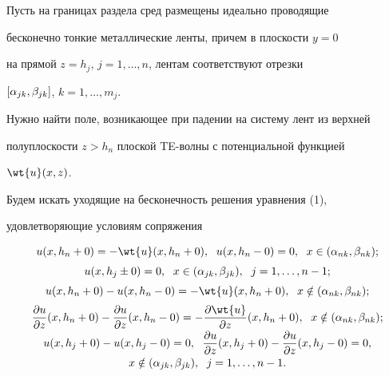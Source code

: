 Пусть на границах раздела сред размещены идеально проводящие


бесконечно тонкие металлические ленты, причем в плоскости $y=0$


на прямой $z=h_j$, $j=1,\dotsc,n$, лентам соответствуют отрезки


$[\alpha_{jk}, \beta_{jk}]$, $k=1,\dotsc,m_j$.


Нужно найти поле, возникающее при падении на систему лент из верхней


полуплоскости $z>h_n$ плоской TE-волны с потенциальной функцией


$\wt{u}(x,z)$.





Будем искать уходящие на бесконечность решения уравнения (1),


удовлетворяющие условиям сопряжения


\begin{equation}


\begin{array}{c}


u(x,h_n+0)=-\wt{u}(x,h_n+0),\ \; u(x,h_n-0)=0, 


\ \; x\in (\al_{nk},\be_{nk});\\[2mm]


%


u(x,h_j\pm0)=0,\ \;  x\in (\al_{jk},\be_{jk}), \ \;


j=1,\dotsc,n-1;\\[2mm]


%


u(x,h_n+0)-u(x,h_n-0)=-\wt{u}(x,h_n+0), 


\ \; x\notin (\al_{nk},\be_{nk});\\[2mm]


%


\dfrac{\pa u}{\pa z}(x,h_n+0)-\dfrac{\pa u}{\pa z}(x,h_n-0)


=-\dfrac{\pa\wt{u}}{\pa z}(x,h_n+0), 


\ \; x\notin (\al_{nk},\be_{nk});\\[2mm]


%


u(x,h_j+0)-u(x,h_j-0)=0,\ \;


\dfrac{\pa u}{\pa z}(x,h_j+0)-\dfrac{\pa u}{\pa z}(x,h_j-0)=0,\\[2mm]


%


x\notin (\al_{jk},\be_{jk}),\ \; j=1,\dotsc,n-1.


\end{array}


\end{equation}





